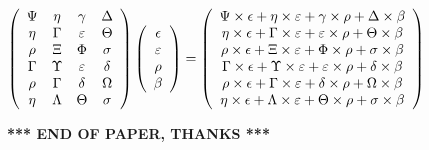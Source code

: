 \documentclass[12pt]{article}
\begin{document}
$  %
 \left( \begin{array}
 {
 c
 c
 c
 c
 }
 \Psi & 
 \eta & 
 \gamma & 
 \Delta \\ 
 \eta & 
 \Gamma & 
 \varepsilon & 
 \Theta \\ 
 \rho & 
                    \Xi & 
 \Phi & 
 \sigma \\ 
 \Gamma & 
 \Upsilon & 
 \varepsilon & 
 \delta \\ 
 \rho & 
 \Gamma & 
 \delta & 
 \Omega \\ 
 \eta & 
 \Lambda & 
 \Theta & 
 \sigma
 \end{array} \right)
 \left( \begin{array}
 {
 c
 }
 \epsilon \\ 
 \varepsilon \\ 
 \rho \\ 
 \beta
 \end{array} \right)
=
 \left( \begin{array}
 {
 c
 }
  \Psi \times  \epsilon +  \eta \times  \varepsilon +  \gamma \times  \rho +  \Delta \times  \beta \\ 
  \eta \times  \epsilon +  \Gamma \times  \varepsilon +  \varepsilon \times  \rho +  \Theta \times  \beta \\ 
  \rho \times  \epsilon +                     \Xi \times  \varepsilon +  \Phi \times  \rho +  \sigma \times  \beta \\ 
  \Gamma \times  \epsilon +  \Upsilon \times  \varepsilon +  \varepsilon \times  \rho +  \delta \times  \beta \\ 
  \rho \times  \epsilon +  \Gamma \times  \varepsilon +  \delta \times  \rho +  \Omega \times  \beta \\ 
  \eta \times  \epsilon +  \Lambda \times  \varepsilon +  \Theta \times  \rho +  \sigma \times  \beta
 \end{array} \right)
$
 
 
 
 
 
\noindent{}

 
 
   
   
 \vspace{0.2in}
 
   
   
   
   
\vspace{1.0in} 
{\textbf{\large{ *** END OF PAPER, THANKS *** }}} 
   
\end{document}
